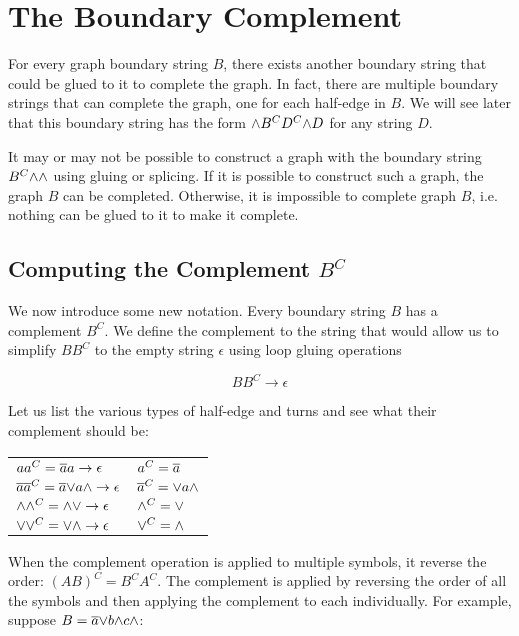 \documentclass[acmtog]{acmart}
\begin{document}
\section{The Boundary Complement}

For every graph boundary string $B$, there exists another boundary string that
could be glued to it to complete the graph. In fact, there are multiple boundary
strings that can complete the graph, one for each half-edge in $B$. We will see
later that this boundary string has the form ${\wedge} B^C D^C {\wedge} D$ for any string
$D$.

It may or may not be possible to construct a graph with the boundary string
$B^C {\wedge} {\wedge}$ using gluing or splicing. If it is possible to construct
such a graph, the graph $B$ can be completed. Otherwise, it is impossible to
complete graph $B$, i.e. nothing can be glued to it to make it complete.

\subsection{Computing the Complement $B^C$}
\label{complement}

We now introduce some new notation. Every boundary string $B$ has a complement
$B^C$. We define the complement to the string that would allow us to simplify
$BB^C$ to the empty string $\epsilon$ using loop gluing operations

\begin{equation}
BB^C \rightarrow \epsilon
\end{equation}

Let us list the various types of half-edge and turns and see what their
complement should be:

\begin{center}
\begin{tabular}{l @{\hskip 1cm} l}
$aa^C=\overline{a}a \rightarrow \epsilon $                   & $a^C=\overline{a}$         \\
$\overline{a}\overline{a}^C=\overline{a}{\vee} a {\wedge} \rightarrow \epsilon $ & $\overline{a}^C={\vee} a {\wedge}$ \\
${\wedge} {\wedge}^C = {\wedge} {\vee} \rightarrow \epsilon $            & $ {\wedge}^C={\vee}$         \\
${\vee} {\vee}^C = {\vee} {\wedge} \rightarrow \epsilon $            & $   {\vee}^C={\wedge}$
\end{tabular}
\end{center}

When the complement operation is applied to multiple symbols, it reverse the
order: $(AB)^C = B^C A^C$. The complement is applied by reversing the order of
all the symbols and then applying the complement to each individually. For
example, suppose $B = \overline{a} {\vee} b {\wedge} c {\wedge}$:
\end{document}
